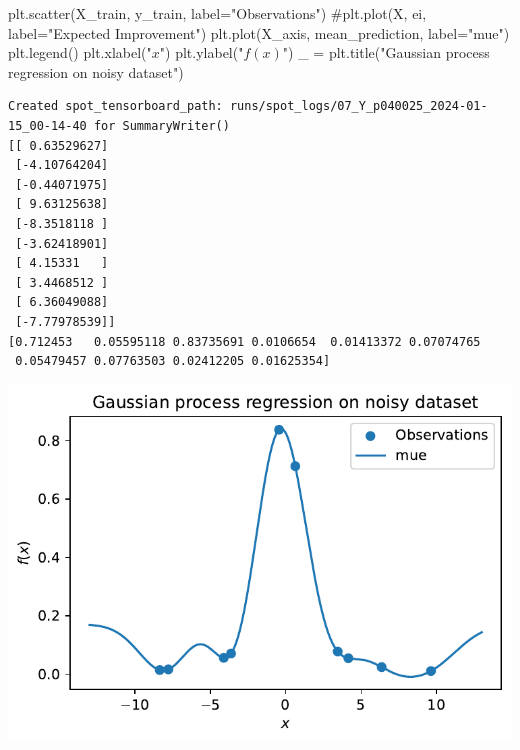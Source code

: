 \documentclass[
  letterpaper,
  DIV=11,
  numbers=noendperiod]{scrreprt}
\newenvironment{Shaded}{\begin{snugshade}}{\end{snugshade}}
\newcommand{\CommentTok}[1]{\textcolor[rgb]{0.37,0.37,0.37}{#1}}
\newcommand{\NormalTok}[1]{\textcolor[rgb]{0.00,0.23,0.31}{#1}}
\newcommand{\OperatorTok}[1]{\textcolor[rgb]{0.37,0.37,0.37}{#1}}
\newcommand{\StringTok}[1]{\textcolor[rgb]{0.13,0.47,0.30}{#1}}
\begin{document}
\begin{Shaded}
\begin{Highlighting}[]
\NormalTok{plt.scatter(X\_train, y\_train, label}\OperatorTok{=}\StringTok{"Observations"}\NormalTok{)}
\CommentTok{\#plt.plot(X, ei, label="Expected Improvement")}
\NormalTok{plt.plot(X\_axis, mean\_prediction, label}\OperatorTok{=}\StringTok{"mue"}\NormalTok{)}
\NormalTok{plt.legend()}
\NormalTok{plt.xlabel(}\StringTok{"$x$"}\NormalTok{)}
\NormalTok{plt.ylabel(}\StringTok{"$f(x)$"}\NormalTok{)}
\NormalTok{\_ }\OperatorTok{=}\NormalTok{ plt.title(}\StringTok{"Gaussian process regression on noisy dataset"}\NormalTok{)}
\end{Highlighting}
\end{Shaded}

\begin{verbatim}
Created spot_tensorboard_path: runs/spot_logs/07_Y_p040025_2024-01-15_00-14-40 for SummaryWriter()
[[ 0.63529627]
 [-4.10764204]
 [-0.44071975]
 [ 9.63125638]
 [-8.3518118 ]
 [-3.62418901]
 [ 4.15331   ]
 [ 3.4468512 ]
 [ 6.36049088]
 [-7.77978539]]
[0.712453   0.05595118 0.83735691 0.0106654  0.01413372 0.07074765
 0.05479457 0.07763503 0.02412205 0.01625354]
\end{verbatim}

\includegraphics{012_num_spot_ei_files/figure-pdf/cell-55-output-2.pdf}
\end{document}
